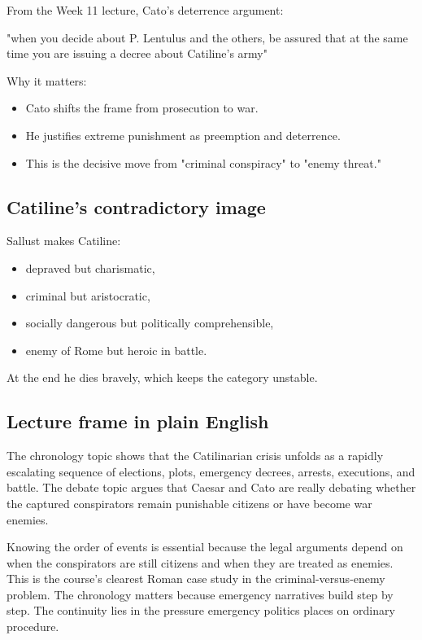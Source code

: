\documentclass[11pt]{article}
\begin{document}
From the Week 11 lecture, Cato's deterrence argument:

\begin{quotebox}
"when you decide about P. Lentulus and the others, be assured that at the same time you are issuing a decree about Catiline's army"
\end{quotebox}

Why it matters:

\begin{itemize}
\item Cato shifts the frame from prosecution to war.
\item He justifies extreme punishment as preemption and deterrence.
\item This is the decisive move from "criminal conspiracy" to "enemy threat."
\end{itemize}

\subsection{Catiline's contradictory image}

Sallust makes Catiline:

\begin{itemize}
\item depraved but charismatic,
\item criminal but aristocratic,
\item socially dangerous but politically comprehensible,
\item enemy of Rome but heroic in battle.
\end{itemize}

At the end he dies bravely, which keeps the category unstable.

\subsection{Lecture frame in plain English}

The chronology topic shows that the Catilinarian crisis unfolds as a rapidly escalating sequence of elections, plots, emergency decrees, arrests, executions, and battle. The debate topic argues that Caesar and Cato are really debating whether the captured conspirators remain punishable citizens or have become war enemies.

Knowing the order of events is essential because the legal arguments depend on when the conspirators are still citizens and when they are treated as enemies. This is the course's clearest Roman case study in the criminal-versus-enemy problem. The chronology matters because emergency narratives build step by step. The continuity lies in the pressure emergency politics places on ordinary procedure.
\end{document}
